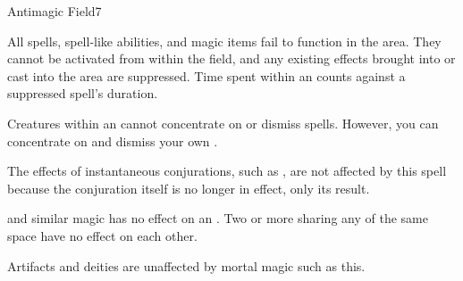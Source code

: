 \begin{spellsection}{Antimagic Field}{7}
    \begin{spellheader}
    \end{spellheader}
    \begin{spellcontent}
        \begin{spelltargetinginfo}
        \end{spelltargetinginfo}
        \begin{spelleffects}
            \spelleffect All spells, spell-like abilities, and magic items fail to function in the area. They cannot be activated from within the field, and any existing effects brought into or cast into the area are suppressed. Time spent within an  counts against a suppressed spell's duration.
            \par Creatures within an  cannot concentrate on or dismiss spells. However, you can concentrate on and dismiss your own .
            \spelldur \durlong \dismissable
        \end{spelleffects}
    \end{spellcontent}
    \begin{spellfooter}
        \spellnotes The effects of instantaneous conjurations, such as , are not affected by this spell because the conjuration itself is no longer in effect, only its result.

        \par {} and similar magic has no effect on an . Two or more  sharing any of the same space have no effect on each other.
        \par Artifacts and deities are unaffected by mortal magic such as this.
        \miscastexplode
    \end{spellfooter}
\end{spellsection}

